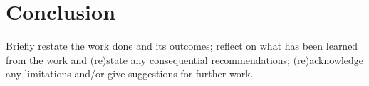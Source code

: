 \chapter{Conclusion}
\label{conclusion}

Briefly restate the work done and its outcomes; reflect on what has been
learned from the work and (re)state any consequential recommendations;
(re)acknowledge any limitations and/or give suggestions for further work.

